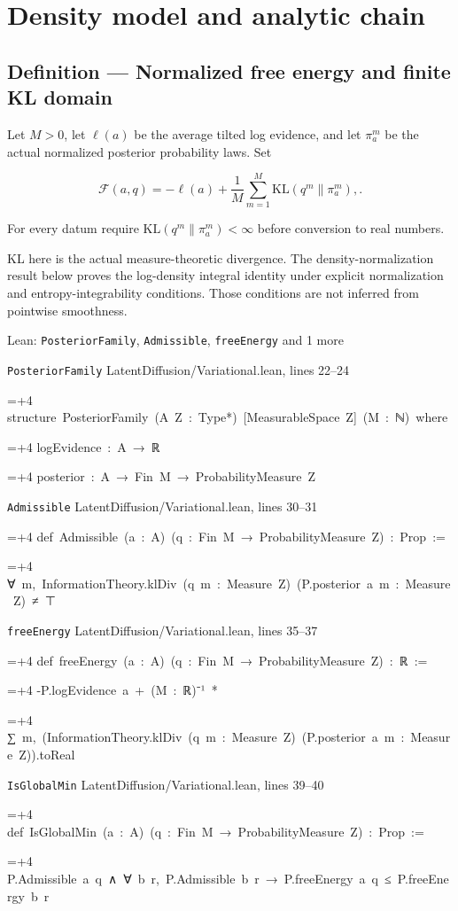 \documentclass[11pt,a4paper]{report}
\newlength{\leancharwidth}
\newenvironment{leancode}{\par\smallskip\begingroup\ttfamily\footnotesize\raggedright
  \settowidth{\leancharwidth}{M}\setlength{\parskip}{0pt}\setlength{\parindent}{0pt}
  \frenchspacing}{\par\endgroup\smallskip}
\newcommand{\leanline}[2]{\hangindent=\dimexpr#1\leancharwidth+4\leancharwidth\relax
  \hangafter=1\noindent\hspace*{#1\leancharwidth}#2\par}
\newcommand{\leansource}[1]{\par{\footnotesize\color{leanmuted}#1}\par}
\begin{document}
\section{Density model and analytic chain}
\subsection{\texorpdfstring{Definition — Normalized free energy and finite KL domain}{Definition — Normalized free energy and finite KL domain}}



Let \(M>0\), let \(\ell(a)\) be the average tilted log evidence, and let \(\pi_a^m\) be the actual normalized posterior probability laws. Set



\[\mathcal F(a,q)=-\ell(a)+\frac1M\sum_{m=1}^M\mathrm{KL}(q^m\|\pi_a^m),.\]



For every datum require \(\mathrm{KL}(q^m\|\pi_a^m)<\infty\) before conversion to real numbers.



KL here is the actual measure-theoretic divergence. The density-normalization result below proves the log-density integral identity under explicit normalization and entropy-integrability conditions. Those conditions are not inferred from pointwise smoothness.

\begin{leanbox}{Lean: \texttt{PosteriorFamily}, \texttt{Admissible}, \texttt{freeEnergy} and 1 more}
\leansource{\texttt{PosteriorFamily} \quad LatentDiffusion/\allowbreak{}Variational.lean, lines 22–24}
\begin{leancode}
\leanline{0}{structure\ PosteriorFamily\ (A\ Z\ :\ Type*)\ [MeasurableSpace\ Z]\ (M\ :\ ℕ)\ where}
\leanline{2}{logEvidence\ :\ A\ →\ ℝ}
\leanline{2}{posterior\ :\ A\ →\ Fin\ M\ →\ ProbabilityMeasure\ Z}
\end{leancode}
\leansource{\texttt{Admissible} \quad LatentDiffusion/\allowbreak{}Variational.lean, lines 30–31}
\begin{leancode}
\leanline{0}{def\ Admissible\ (a\ :\ A)\ (q\ :\ Fin\ M\ →\ ProbabilityMeasure\ Z)\ :\ Prop\ :=}
\leanline{2}{∀\ m,\ InformationTheory.klDiv\ (q\ m\ :\ Measure\ Z)\ (P.posterior\ a\ m\ :\ Measure\ Z)\ ≠\ ⊤}
\end{leancode}
\leansource{\texttt{freeEnergy} \quad LatentDiffusion/\allowbreak{}Variational.lean, lines 35–37}
\begin{leancode}
\leanline{0}{def\ freeEnergy\ (a\ :\ A)\ (q\ :\ Fin\ M\ →\ ProbabilityMeasure\ Z)\ :\ ℝ\ :=}
\leanline{2}{-P.logEvidence\ a\ +\ (M\ :\ ℝ)⁻¹\ *}
\leanline{4}{∑\ m,\ (InformationTheory.klDiv\ (q\ m\ :\ Measure\ Z)\ (P.posterior\ a\ m\ :\ Measure\ Z)).toReal}
\end{leancode}
\leansource{\texttt{IsGlobalMin} \quad LatentDiffusion/\allowbreak{}Variational.lean, lines 39–40}
\begin{leancode}
\leanline{0}{def\ IsGlobalMin\ (a\ :\ A)\ (q\ :\ Fin\ M\ →\ ProbabilityMeasure\ Z)\ :\ Prop\ :=}
\leanline{2}{P.Admissible\ a\ q\ ∧\ ∀\ b\ r,\ P.Admissible\ b\ r\ →\ P.freeEnergy\ a\ q\ ≤\ P.freeEnergy\ b\ r}
\end{leancode}
\end{leanbox}
\end{document}
